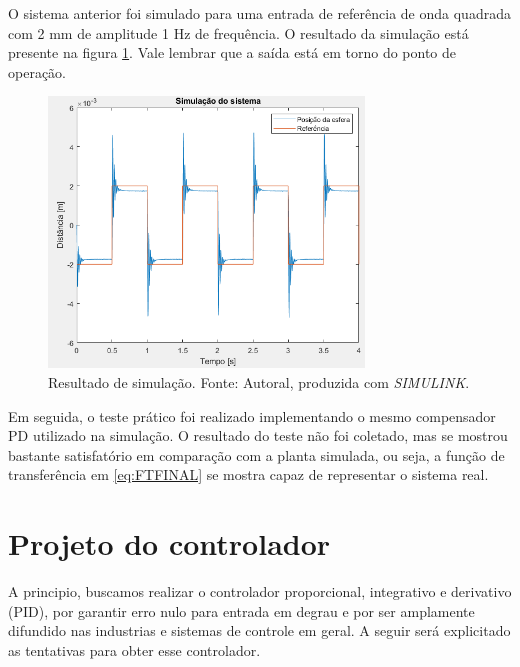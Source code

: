 \documentclass{ifacconf}
\begin{document}
O sistema anterior foi simulado para uma entrada de referência de onda quadrada com 2 mm de amplitude 1 Hz de frequência. O resultado da simulação está presente na figura \ref{fig:simvalidacao}.
Vale lembrar que a saída está em torno do ponto de operação.
\begin{figure}[!htb]
  \begin{center}
  \includegraphics[width=8.4cm]{figures/SimPDvalidacao.png}    %
  \caption{Resultado de simulação. Fonte: Autoral, produzida com \textit{SIMULINK}.} 
  \label{fig:simvalidacao}
  \end{center}
\end{figure}

Em seguida, o teste prático foi realizado implementando o mesmo compensador PD utilizado na simulação. O resultado do teste não foi coletado, mas se
mostrou bastante satisfatório em comparação com a planta simulada, ou seja, a função de transferência em \ref{eq:FTFINAL} se mostra capaz de representar
o sistema real.

\section{Projeto do controlador}

A principio, buscamos realizar o controlador proporcional, integrativo e derivativo (PID), 
por garantir erro nulo para entrada em degrau e por ser amplamente difundido nas industrias
e sistemas de controle em geral. A seguir será explicitado as tentativas para obter esse controlador.
\end{document}
